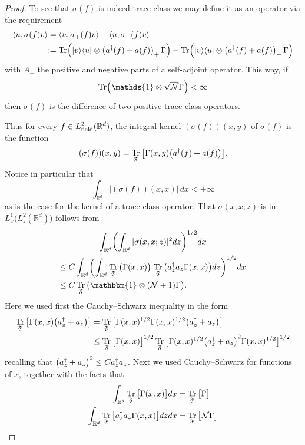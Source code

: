 \documentclass[10pt]{amsart}
\theoremstyle{definition}\newtheorem{defi}[theo]{Definition}\newtheorem{rema}[theo]{Remark}\newtheorem{exam}[theo]{Example}\newtheorem{exem}[theo]{Example}\newtheorem{nota}[theo]{Notation}
\DeclareMathOperator{\Tr}{Tr}
\DeclareMathOperator{\field}{field}
\newcommand{\R}{\mathbb{R}}
\newcommand{\cN}{\mathcal{N}}
\newcommand{\gF}{\mathfrak{F}}
\newcommand{\1}{\mathds{1}}
\let\oldin\in
\renewcommand{\in}{\mathchoice{\oldin}{\oldin}{\,\oldin\,}{\,\oldin\,}}
\let\originalleft\left
\let\originalright\right
\renewcommand{\left}{\mathopen{}\mathclose\bgroup\originalleft}
\renewcommand{\right}{\aftergroup\egroup\originalright}
\newcommand*{\Mk}{\mkern -2mu}
\newcommand*{\MK}{\mkern 2mu}
\begin{document}
\begin{proof}
To see that $\sigma(f)$ is indeed trace-class we may define it as an operator via the requirement
\begin{align*}
\left\langle u, \sigma (f) v \right\rangle &= \left\langle u, \sigma_+ (f) v \right\rangle - \left\langle u, \sigma_- (f) v \right\rangle\\
\,\MK &\!\Mk:= \Tr\left(|v \rangle \langle u| \otimes \left(a^\dagger(f) + a (f) \right)_+ \,\Gamma\right) - \Tr\left(|v \rangle \langle u| \otimes \left(a^\dagger(f) + a (f) \right)_- \,\Gamma\right)
\end{align*}
with $A_\pm$ the positive and negative parts of a self-adjoint operator. This way, if
\begin{equation*}
\Tr \left(\1 \otimes \sqrt{\cN} \Gamma \right) < \infty
\end{equation*}
then $ \sigma (f)$ is the difference of two positive trace-class operators.


Thus for every $f\in L^2_{\field}(\R^d)$, the integral kernel $(\sigma(f))(x,y)$ of $\sigma(f)$ is the function
\begin{equation*}
\left(\sigma(f)\right)(x,y)=\Tr_{\gF}\big[\Gamma(x,y)\left(a^\dagger(f) + a (f) \right) \big].
\end{equation*}
Notice in particular that
\begin{equation*}
\int_{\R^d} |(\sigma(f))(x,x)|\,dx <+\infty
\end{equation*}
as is the case for the kernel of a trace-class operator. That $\sigma(x,x;z)$ is in $L^1_x\big(L^2_z(\R^d)\big)$ follows from
\begin{multline}\label{eq:summability_sigma}
\int_{\R^d}\left(\int_{\R^d}|\sigma(x,x;z)|^2dz\right)^{1/2}dx\\
\begin{aligned}
\le\;& C \int_{\R^d}\left(\int_{\R^d} \Tr_{\gF}\big(\Gamma(x,x)\big)\,\Tr_{\gF} \big(a^\dagger_z a_z \Gamma(x,x)\big)dz\right)^{1/2}dx\\
\le\;& C \Tr_{\gF}\big(\mathbbm{1}\otimes(\cN+1) \Gamma\big).
\end{aligned}
\end{multline}
Here we used first the Cauchy--Schwarz inequality in the form
\begin{align*}
\Tr_{\gF}\big[\Gamma(x,x) \left(a^\dagger_z + a_z \right)\big] &= \Tr_{\gF}\big[\Gamma(x,x)^{1/2} \Gamma(x,x)^{1/2} \left(a^\dagger_z + a_z \right)\big]\\
&\leq \Tr_{\gF}\big[\Gamma(x,x)\big] ^{1/2} \Tr_{\gF}\big[\Gamma(x,x)^{1/2} \left(a^\dagger_z + a_z \right)^2 \Gamma(x,x)^{1/2}\big] ^{1/2}
\end{align*}
recalling that $\left(a^\dagger_z + a_z \right)^2 \leq C a_z^\dagger a_z$. Next we used Cauchy--Schwarz for functions of $x$, together with the facts that
\begin{align*}
\int_{\R^d} \Tr_{\gF}\big[\Gamma(x,x) \big]dx &= \Tr_{\gF}\big[\Gamma \big]\\
\int_{\R^d} \Tr_{\gF}\big[a_z^\dagger a_z \Gamma(x,x) \big]dz dx &= \Tr_{\gF}\big[\cN \Gamma \big]\qedhere
\end{align*}
\end{proof}
\end{document}
